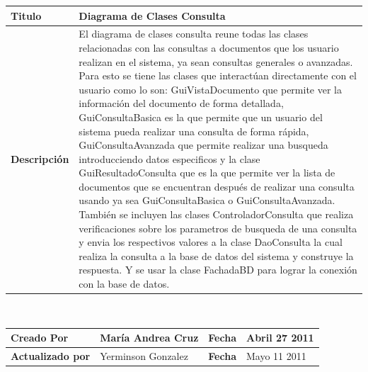			
	\begin{tabular}{|p{5cm}|p{11cm}|}\hline
	{\bf Titulo} & {Diagrama de Clases Consulta}\\
	\hline
	{\bf Descripción} & {El diagrama de clases consulta reune todas las clases
	relacionadas con las consultas a documentos que los usuario realizan en el sistema,
	ya sean consultas generales o avanzadas. Para esto se tiene las clases que interactúan
	directamente con el usuario como lo son: GuiVistaDocumento que permite ver la información del
	documento de forma detallada, GuiConsultaBasica es la que permite que un usuario del sistema
	pueda realizar una consulta de forma rápida, GuiConsultaAvanzada que permite realizar una
	busqueda introducciendo datos especificos y la clase GuiResultadoConsulta que es la que permite
	ver la lista de documentos que se encuentran después de realizar una consulta usando ya sea
	GuiConsultaBasica o GuiConsultaAvanzada.\newline
	También se incluyen las clases ControladorConsulta que realiza verificaciones sobre los
	parametros de busqueda de una consulta y envia los respectivos valores a la clase DaoConsulta
	la cual realiza la consulta a la base de datos del sistema y construye la respuesta. Y se usar
	la clase FachadaBD para lograr la conexión con la base de datos.}\\
	\hline
	\end{tabular}\\[.5cm]
		
	\begin{tabular}{|p{3.5cm}|p{4.5cm}|p{2.5cm}|p{4.5cm}|}\hline
	{\bf Creado Por} & {María Andrea Cruz} & {\bf Fecha} & {Abril 27 2011}\\
	\hline
	{\bf Actualizado por} & {Yerminson Gonzalez} & {\bf Fecha} & {Mayo 11 2011}\\
	\hline
	\end{tabular}

